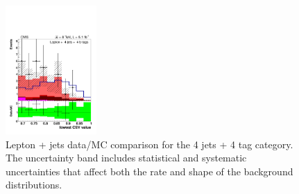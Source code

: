 \begin{figure}[hbtp]
\begin{center}
   \includegraphics[width=0.31\textwidth]{Figures/Analysis_1_Diagrams/d2MCPlots_lowest_btag_cut7_j4_t4_Combined_HtWgt.pdf}
   \hspace{0.055\textwidth}
   \caption{Lepton + jets data/MC comparison for the 4 jets + 4 tag category.  The uncertainty band includes statistical and systematic uncertainties that affect both the rate and shape of the background distributions.}
   \label{fig:lj_input_4j_4t_part2}
 \end{center}
\end{figure}


%
%

\clearpage

